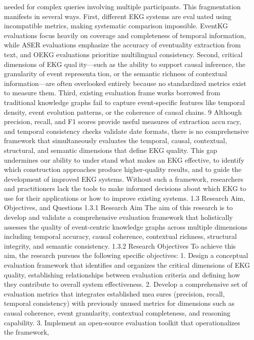 needed for complex queries involving multiple participants.
This fragmentation manifests in several ways. First, different EKG systems are evaluated using incompatible metrics, making systematic comparison impossible. EventKG
evaluations focus heavily on coverage and completeness of temporal information, while
ASER evaluations emphasize the accuracy of eventuality extraction from text, and OEKG
evaluations prioritize multilingual consistency. Second, critical dimensions of EKG quality—such as the ability to support causal inference, the granularity of event representation, or the semantic richness of contextual information—are often overlooked entirely
because no standardized metrics exist to measure them. Third, existing evaluation frameworks borrowed from traditional knowledge graphs fail to capture event-specific features
like temporal density, event evolution patterns, or the coherence of causal chains.
9
Although precision, recall, and F1 scores provide useful measures of extraction accuracy, and temporal consistency checks validate date formats, there is no comprehensive
framework that simultaneously evaluates the temporal, causal, contextual, structural, and
semantic dimensions that define EKG quality. This gap undermines our ability to understand what makes an EKG effective, to identify which construction approaches produce
higher-quality results, and to guide the development of improved EKG systems. Without
such a framework, researchers and practitioners lack the tools to make informed decisions
about which EKG to use for their applications or how to improve existing systems.
1.3 Research Aim, Objectives, and Questions
1.3.1 Research Aim
The aim of this research is to develop and validate a comprehensive evaluation framework
that holistically assesses the quality of event-centric knowledge graphs across multiple
dimensions including temporal accuracy, causal coherence, contextual richness, structural
integrity, and semantic consistency.
1.3.2 Research Objectives
To achieve this aim, the research pursues the following specific objectives:
1. Design a conceptual evaluation framework that identifies and organizes the critical
dimensions of EKG quality, establishing relationships between evaluation criteria
and defining how they contribute to overall system effectiveness.
2. Develop a comprehensive set of evaluation metrics that integrates established measures (precision, recall, temporal consistency) with previously unused metrics for
dimensions such as causal coherence, event granularity, contextual completeness,
and reasoning capability.
3. Implement an open-source evaluation toolkit that operationalizes the framework,

